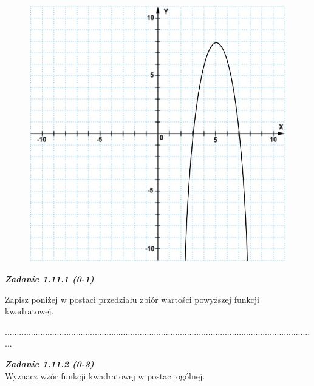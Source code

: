 \documentclass[12pt,a4paper]{article}
\theoremstyle{break}
\begin{document}
		\begin{figure}[h]
			\centering
			\includegraphics[scale=0.7]{pm1.jpeg}
		\end{figure}

		\begin{mdframed}[%
			linecolor=white,%
			innertopmargin=\topskip,
			shadowsize=0,%
			innertopmargin=5,%
			innerbottommargin=5,%
			leftmargin=10,%
			rightmargin=10,%
			backgroundcolor=gray!20,%
			innertopmargin=0pt,]
			\vspace{0.2cm}
			\textbf{\textit{Zadanie 1.11.1 (0-1)}}
			
			
		\end{mdframed}
	
		Zapisz poniżej w postaci przedziału zbiór wartości powyższej funkcji kwadratowej. \vspace{1cm}
		
		....................................................................................................................................
		
		\begin{mdframed}[%
			linecolor=white,%
			innertopmargin=\topskip,
			shadowsize=0,%
			innertopmargin=5,%
			innerbottommargin=5,%
			leftmargin=10,%
			rightmargin=10,%
			backgroundcolor=gray!20,%
			innertopmargin=0pt,]
			\vspace{0.2cm}
			\textbf{\textit{Zadanie 1.11.2 (0-3)}}
			\\
			Wyznacz wzór funkcji kwadratowej w postaci ogólnej.
		\end{mdframed}
	
\end{document}
